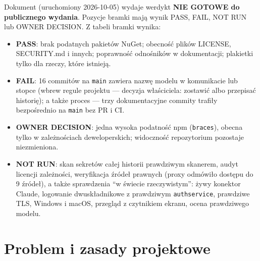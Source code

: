 
Dokument  (uruchomiony 2026-10-05) wydaje
werdykt \textbf{NIE GOTOWE do publicznego wydania}. Pozycje bramki mają wynik
PASS, FAIL, NOT RUN lub OWNER DECISION. Z tabeli bramki wynika:

\begin{itemize}[itemsep=2pt]
  \item \textbf{PASS}: brak podatnych pakietów NuGet; obecność plików LICENSE,
        SECURITY.md i innych; poprawność odnośników w dokumentacji; plakietki
        tylko dla rzeczy, które istnieją.
  \item \textbf{FAIL}: 16 commitów na \texttt{main} zawiera nazwę modelu
        w komunikacie lub stopce (wbrew regule projektu --- decyzja właściciela:
        zostawić albo przepisać historię); a także proces --- trzy dokumentacyjne
        commity trafiły bezpośrednio na \texttt{main} bez PR i CI.
  \item \textbf{OWNER DECISION}: jedna wysoka podatność npm (\texttt{braces}),
        obecna tylko w zależnościach deweloperskich; widoczność repozytorium
        pozostaje niezmieniona.
  \item \textbf{NOT RUN}: skan sekretów całej historii prawdziwym skanerem,
        audyt licencji zależności, weryfikacja źródeł prawnych (proxy odmówiło
        dostępu do 9 źródeł), a także sprawdzenia ``w świecie rzeczywistym'':
        żywy konektor Claude, logowanie dwuskładnikowe z prawdziwym
        \texttt{authservice}, prawdziwe TLS, Windows i macOS, przegląd
        z czytnikiem ekranu, ocena prawdziwego modelu.
\end{itemize}


\section{Problem i zasady projektowe}

